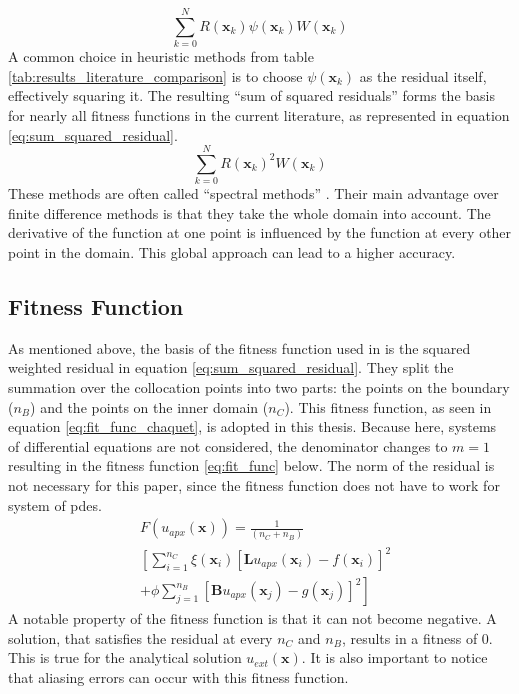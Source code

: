 \documentclass[./\jobname.tex]{subfiles}
\begin{document}
\begin{equation}
\label{eq:wrm_colloc}
\sum_{k=0}^{N} R(\mathbf{x}_k) \psi(\mathbf{x}_k) W(\mathbf{x}_k)
\end{equation}
A common choice in heuristic methods from table \ref{tab:results_literature_comparison} is to choose $\psi(\mathbf{x}_k)$ as the residual itself, effectively squaring it. The resulting ``sum of squared residuals'' forms the basis for nearly all fitness functions in the current literature, as represented in equation \eqref{eq:sum_squared_residual}.
\begin{equation}
\label{eq:sum_squared_residual}
\sum_{k=0}^{N} R(\mathbf{x}_k)^2 W(\mathbf{x}_k)
\end{equation}
These methods are often called ``spectral methods'' \cite{shen_spectral_2011}. Their main advantage over finite difference methods is that they take the whole domain into account. The derivative of the function at one point is influenced by the function at every other point in the domain. This global approach can lead to a higher accuracy. 

\subsection{Fitness Function}
\label{chap:fit_func}
As mentioned above, the basis of the fitness function used in \cite{chaquet_using_2019} is the squared weighted residual in equation \eqref{eq:sum_squared_residual}. They split the summation over the collocation points into two parts: the points on the boundary ($n_B$) and the points on the inner domain ($n_C$). This fitness function, as seen in equation \eqref{eq:fit_func_chaquet}, is adopted in this thesis. Because here, systems of differential equations are not considered, the denominator changes to $m=1$ resulting in the fitness function \eqref{eq:fit_func} below. The norm of the residual is not necessary for this paper, since the fitness function does not have to work for system of \gls{pde}s.
\begin{equation}
\label{eq:fit_func}
\begin{split}
& F(u_{apx}(\mathbf{x})) = \frac{1}{(n_C + n_B)} \\ & \left[ \sum_{i=1}^{n_C} \right. \xi (\mathbf{x}_i) \left[ \mathbf{L}u_{apx}(\mathbf{x}_i) - f(\mathbf{x}_i) \right]^2 \\ & + \left. \phi \sum_{j=1}^{n_B} \left[ \mathbf{B}u_{apx}(\mathbf{x}_j) - g(\mathbf{x}_j)\right]^2 \right]
\end{split} 
\end{equation}
A notable property of the fitness function is that it can not become negative. A solution, that satisfies the residual at every $n_C$ and $n_B$, results in a fitness of 0. This is true for the analytical solution $u_{ext}(\mathbf{x})$. It is also important to notice that aliasing errors can occur with this fitness function. 
\end{document}
